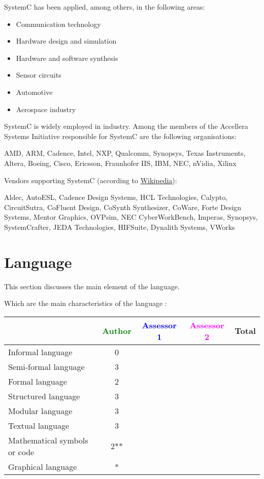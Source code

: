 SystemC has been applied, among others, in the following areas:

\begin{itemize}
\item Communication technology
\item Hardware design and simulation
\item Hardware and software synthesis
\item Sensor circuits
\item Automotive
\item Aerospace industry
\end{itemize}

SystemC is widely employed in industry. Among the members of the Accellera Systems Initiative responsible for SystemC are the following organisations:

AMD, ARM, Cadence, Intel, NXP, Qualcomm, Synopsys, Texas Instruments, Altera, Boeing, Cisco, Ericsson, Fraunhofer IIS, IBM, NEC, nVidia, Xilinx

Vendors supporting SystemC (according to \href{http://en.wikipedia.org/wiki/SystemC}{Wikipedia}):

Aldec, AutoESL, Cadence Design Systems, HCL Technologies, Calypto, CircuitSutra, CoFluent Design, CoSynth Synthesizer, CoWare, Forte Design Systems, Mentor Graphics, OVPsim, NEC CyberWorkBench, Imperas, Synopsys, SystemCrafter, JEDA Technologies, HIFSuite, Dynalith Systems, VWorks


\section{Language}
This section discusses the main element of the language.

Which are the main characteristics of the language :

\begin{tabular}{|l | c | c | c | c|}
\hline
& \textcolor{green}{Author} & \textcolor{blue}{Assessor 1} & \textcolor{magenta}{Assessor 2} & Total \\
\hline
Informal language &0 & & & \\
\hline
Semi-formal language &3 & & & \\
\hline
Formal language &2 & & & \\
\hline
Structured language &3 & & & \\
\hline
Modular language &3 & & & \\
\hline
Textual language &3 & & & \\
\hline
Mathematical symbols or code &2** & & & \\
\hline
Graphical language &* & & & \\
\hline
\end{tabular}

